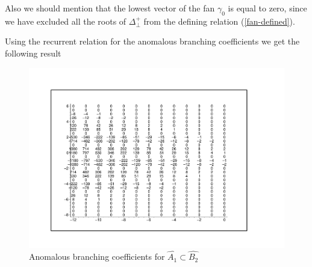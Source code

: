 \documentclass[a4paper,12pt]{article}
\theoremstyle{definition} \newtheorem{Def}{Definition}
\begin{document}
Also we should mention that the lowest vector of the fan $\gamma_0$ is equal to zero, since we have excluded all the roots of $\Delta^{+}_{\bot}$ from the defining relation (\ref{fan-defined}).

Using the recurrent relation for the anomalous branching coefficients we get the following result
\begin{figure}[ph]
  \centering
  \includegraphics[width=130mm]{AffineB2_A1_branching.pdf}
  \caption{Anomalous branching coefficients for $\hat{A_1}\subset \hat{B_2}$}
  \label{fig:AffineB2_A1_branching}
\end{figure}
\end{document}
